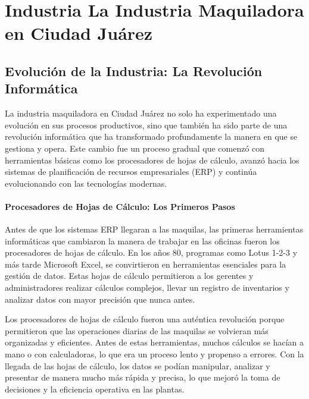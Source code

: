 \documentclass[
  letterpaper,
]{book}
\begin{document}

\chapter{Industria La Industria Maquiladora en Ciudad
Juárez}\label{industria-la-industria-maquiladora-en-ciudad-juuxe1rez}

\section{Evolución de la Industria: La Revolución
Informática}\label{evoluciuxf3n-de-la-industria-la-revoluciuxf3n-informuxe1tica}

La industria maquiladora en Ciudad Juárez no solo ha experimentado una
evolución en sus procesos productivos, sino que también ha sido parte de
una revolución informática que ha transformado profundamente la manera
en que se gestiona y opera. Este cambio fue un proceso gradual que
comenzó con herramientas básicas como los procesadores de hojas de
cálculo, avanzó hacia los sistemas de planificación de recursos
empresariales (ERP) y continúa evolucionando con las tecnologías
modernas.

\subsubsection{Procesadores de Hojas de Cálculo: Los Primeros
Pasos}\label{procesadores-de-hojas-de-cuxe1lculo-los-primeros-pasos}

Antes de que los sistemas ERP llegaran a las maquilas, las primeras
herramientas informáticas que cambiaron la manera de trabajar en las
oficinas fueron los procesadores de hojas de cálculo. En los años 80,
programas como Lotus 1-2-3 y más tarde Microsoft Excel, se convirtieron
en herramientas esenciales para la gestión de datos. Estas hojas de
cálculo permitieron a los gerentes y administradores realizar cálculos
complejos, llevar un registro de inventarios y analizar datos con mayor
precisión que nunca antes.

Los procesadores de hojas de cálculo fueron una auténtica revolución
porque permitieron que las operaciones diarias de las maquilas se
volvieran más organizadas y eficientes. Antes de estas herramientas,
muchos cálculos se hacían a mano o con calculadoras, lo que era un
proceso lento y propenso a errores. Con la llegada de las hojas de
cálculo, los datos se podían manipular, analizar y presentar de manera
mucho más rápida y precisa, lo que mejoró la toma de decisiones y la
eficiencia operativa en las plantas.
\end{document}
